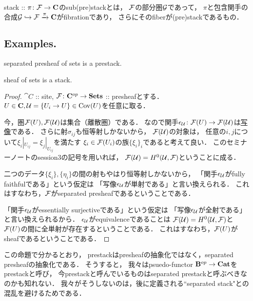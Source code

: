 \documentclass[a4paper, dvipdfmx]{jsarticle}
\begin{document}
\begin{Def}
    stack :: $\pi \colon \mathcal{F} \to \mathbf{C}$のsub(pre)stackとは，
    $\mathcal{F}$の部分圏$\mathcal{G}$であって，
    $\pi$と包含関手の合成$\mathcal{G} \hookrightarrow \mathcal{F} \xrightarrow{\pi} \mathbf{C}$がfibrationであり，
    さらにそのfiberが(pre)stackであるもの．
\end{Def}

\subsection{Examples.}
\begin{Prop}
    \begin{myenum}
        \item separated presheaf of sets is a prestack.
        \item sheaf of sets is a stack.
    \end{myenum}
\end{Prop}
\begin{proof}
    $\cat{C}$ :: site, $\mathcal{F} \colon \mathbf{C}^{op} \to \mathbf{Sets}$ :: presheafとする．
    $U \in \mathbf{C}, \mathcal{U}=\{U_i \to U\} \in \operatorname{Cov}(U)$を任意に取る．

    今，圏$\mathcal{F}(U), \mathcal{F}(\mathcal{U})$は集合（離散圏）である．
    なので関手$\epsilon_{\mathcal{U}} \colon \mathcal{F}(U) \to \mathcal{F}(\mathcal{U})$は\underline{写像}である．
    さらに射$\sigma_{ij}$も恒等射しかないから，
    $\mathcal{F}(\mathcal{U})$の対象は，
    任意の$i,j$について$\xi_i|_{U_{ij}}=\xi_j|_{U_{ij}}$を満たす
    $\xi_i \in \mathcal{F}(U_i)$の族$\{\xi_i\}_i$であると考えて良い．
    このセミナーノートのsession3の記号を用いれば，
    $\mathcal{F}(\mathcal{U})=H^0(\mathcal{U}, \mathcal{F})$ということに成る．

    二つのデータ$\{\xi_i\}, \{\eta_i\}$の間の射もやはり恒等射しかないから，
    「関手$\epsilon_{\mathcal{U}}$がfully faithfulである」という仮定は
    「写像$\epsilon_{\mathcal{U}}$が単射である」と言い換えられる．
    これはすなわち，$\mathcal{F}$がseparated presheafであるということである．

    「関手$\epsilon_{\mathcal{U}}$がessentially surjectiveである」という仮定は
    「写像$\epsilon_{\mathcal{U}}$が全射である」と言い換えられるから．
    $\epsilon_{\mathcal{U}}$がequivalenceであることは
    $\mathcal{F}(\mathcal{U})=H^0(\mathcal{U}, \mathcal{F})$と$\mathcal{F}(U)$の間に全単射が存在するということである．
    これはすなわち，$\mathcal{F}(U)$がsheafであるということである．
\end{proof}

\begin{Remark}
    この命題で分かるとおり，
    prestackはpresheafの抽象化ではなく，separated presheafの抽象化である．
    そうすると，
    我々はpsuedo-functor $\mathbf{B}^{op} \to \mathbf{Cat}$をprestackと呼び，
    今prestackと呼んでいるものはseparated prestackと呼ぶべきなのかも知れない．
    我々がそうしないのは，後に定義される``separated stack"との混乱を避けるためである．
\end{Remark}
\end{document}
